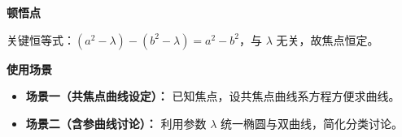 \begin{explanationbox}
	\medskip
	\textbf{\textcolor{CExplanation}{顿悟点}}

	\medskip
	关键恒等式：$(a^{2}-\lambda)-(b^{2}-\lambda)=a^{2}-b^{2}$，与 $\lambda$ 无关，故焦点恒定。

	\medskip
	\textbf{\textcolor{CExplanation}{使用场景}}
	\begin{itemize}[leftmargin=*,itemsep=0.5em,topsep=0.4em]
		\item \textbf{场景一（共焦点曲线设定）：} 已知焦点，设共焦点曲线系方程方便求曲线。
		\item \textbf{场景二（含参曲线讨论）：} 利用参数 $\lambda$ 统一椭圆与双曲线，简化分类讨论。
	\end{itemize}

\end{explanationbox}
